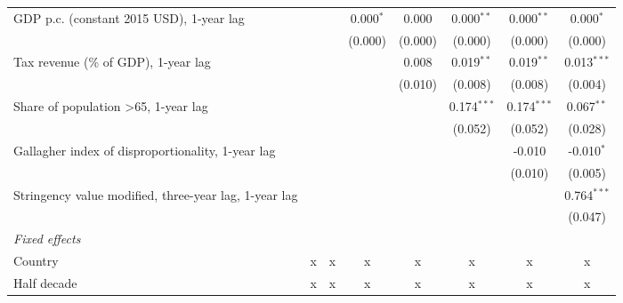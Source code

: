\begin{table}[htbp]
\begin{tabular}{lccccccc}
      GDP p.c. (constant 2015 USD), 1-year lag                        &               &               & 0.000$^{*}$  & 0.000        & 0.000$^{**}$  & 0.000$^{**}$  & 0.000$^{*}$\\   
                                                                      &               &               & (0.000)      & (0.000)      & (0.000)       & (0.000)       & (0.000)\\   
      Tax revenue (\% of GDP), 1-year lag                             &               &               &              & 0.008        & 0.019$^{**}$  & 0.019$^{**}$  & 0.013$^{***}$\\   
                                                                      &               &               &              & (0.010)      & (0.008)       & (0.008)       & (0.004)\\   
      Share of population >65, 1-year lag                             &               &               &              &              & 0.174$^{***}$ & 0.174$^{***}$ & 0.067$^{**}$\\   
                                                                      &               &               &              &              & (0.052)       & (0.052)       & (0.028)\\   
      Gallagher index of disproportionality, 1-year lag               &               &               &              &              &               & -0.010        & -0.010$^{*}$\\   
                                                                      &               &               &              &              &               & (0.010)       & (0.005)\\   
      Stringency value modified, three-year lag, 1-year lag           &               &               &              &              &               &               & 0.764$^{***}$\\   
                                                                      &               &               &              &              &               &               & (0.047)\\   
      \emph{Fixed effects}\\
      Country                                                         & x             & x             & x            & x            & x             & x             & x\\  
      Half decade                                                     & x             & x             & x            & x            & x             & x             & x\\  

\end{tabular}
\end{table}

